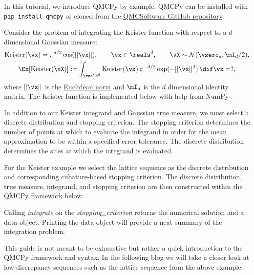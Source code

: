 In this tutorial, we introduce QMCPy \cite{QMCPy2020a_alt}  by example. QMCPy can be installed with \texttt{pip install qmcpy} or cloned from the  \href{https://github.com/QMCSoftware/QMCSoftware/tree/master/python_prototype}{QMCSoftware GitHub repository}.

Consider the problem of integrating the Keister function \cite{Kei96} with respect to a $d$-dimensional Gaussian measure: 
\begin{gather*}
    \text{Keister}(\vx) = \pi^{d/2} \cos(||\vx||), \qquad \vx \in \reals^d, \qquad \vX \sim \mathcal{N}(\vzero_d,\mI_d/2),  \\
    \Ex[\text{Keister}(\vX)] : = \int_{\reals^d} \text{Keister}(\vx) \, \pi^{-d/2} \exp( - ||\vx||^2) \,  \dif \vx = ?,
\end{gather*}
where $||\vx||$ is the \href{https://en.wikipedia.org/wiki/Norm_(mathematics)}{Euclidean norm} and $\mI_d$ is the $d$ dimensional identity matrix. The Keister function is implemented below with help from NumPy \cite{numpy}.



In addition to our Keister integrand and Gaussian true measure, we must select a discrete distribution and stopping criterion. The stopping criterion determines the number of points at which to evaluate the integrand in order for the mean approximation to be within a specified error tolerance. The discrete distribution determines the sites at which the integrand is evaluated.

For the Keister example we select the lattice sequence as the discrete distribution and corresponding cubature-based stopping criterion. The discrete distribution, true measure, integrand, and stopping criterion are then constructed within the QMCPy framework below. 



Calling \textit{integrate} on the \textit{stopping\_criterion} returns the numerical solution and a data object. Printing the data object will provide a neat summary of the integration problem.



This guide is not meant to be exhaustive but rather a quick introduction to the QMCPy framework and syntax. In the following blog we will take a closer look at low-discrepancy sequences such as the lattice sequence from the above example.  
